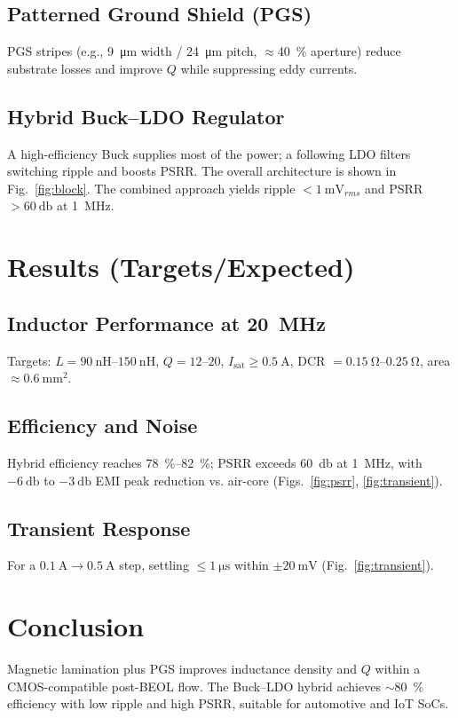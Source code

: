 \documentclass[journal]{IEEEtran}
\begin{document}
\subsection{Patterned Ground Shield (PGS)}
PGS stripes (e.g., \SI{9}{\micro\meter} width / \SI{24}{\micro\meter} pitch, \(\approx\)\SI{40}{\percent} aperture) reduce substrate losses and improve \(Q\) while suppressing eddy currents.

\subsection{Hybrid Buck--LDO Regulator}
A high-efficiency Buck supplies most of the power; a following LDO filters switching ripple and boosts PSRR. The overall architecture is shown in Fig.~\ref{fig:block}. The combined approach yields ripple $<\SI{1}{\milli\volt_{rms}}$ and PSRR $>\SI{60}{\decibel}$ at \SI{1}{\mega\hertz}.

\section{Results (Targets/Expected)}
\subsection{Inductor Performance at \SI{20}{\mega\hertz}}
Targets: \(L=\SIrange{90}{150}{\nano\henry}\), \(Q=\numrange{12}{20}\), \(I_{\mathrm{sat}}\ge\SI{0.5}{\ampere}\), DCR \(=\SIrange{0.15}{0.25}{\ohm}\), area \(\approx\SI{0.6}{\milli\meter\squared}\).

\subsection{Efficiency and Noise}
Hybrid efficiency reaches \SIrange{78}{82}{\percent}; PSRR exceeds \SI{60}{\decibel} at \SI{1}{\mega\hertz}, with \(-\SI{6}{\decibel}\) to \(-\SI{3}{\decibel}\) EMI peak reduction vs. air-core (Figs.~\ref{fig:psrr}, \ref{fig:transient}).

\subsection{Transient Response}
For a \(\SI{0.1}{\ampere}\rightarrow\SI{0.5}{\ampere}\) step, settling \(\le\SI{1}{\micro\second}\) within \(\pm\SI{20}{\milli\volt}\) (Fig.~\ref{fig:transient}).

\section{Conclusion}
Magnetic lamination plus PGS improves inductance density and \(Q\) within a CMOS-compatible post-BEOL flow. The Buck--LDO hybrid achieves \(\sim\)\SI{80}{\percent} efficiency with low ripple and high PSRR, suitable for automotive and IoT SoCs.
\end{document}
